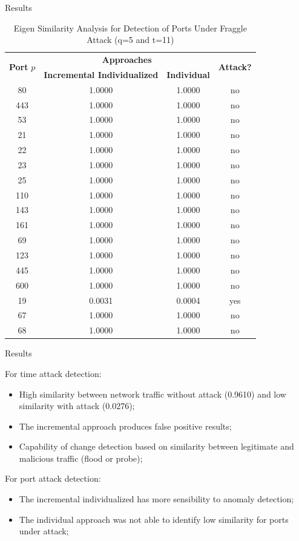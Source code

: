\documentclass[newPxFont, numfooter, sectionpages]{beamer}
\begin{document}
\begin{frame}{Results}
	
	\begin{table}[h!]
	  \centering
	  \tiny
	  \caption{Eigen Similarity Analysis for Detection of Ports Under Fraggle Attack (q=5 and t=11)}
	  \label{tab:tab10}
	  \begin{tabular}{ c c c c }
		\toprule
		\multirow{2}{*}{\textbf{Port} $p$}   &\multicolumn{2}{c}{\textbf{Approaches}} &\multirow{2}{*}{\textbf{Attack?}}\\ 
				\hhline{~--~}
				&\textbf{Incremental Individualized} &\textbf{Individual}\\
		\midrule
		80 &1.0000 &1.0000 &no \\
		443 &1.0000 &1.0000 &no \\
		53 &1.0000 &1.0000 &no \\
		21 &1.0000 &1.0000 &no \\
		22 &1.0000 &1.0000 &no \\
		23 &1.0000 &1.0000 &no \\
		25 &1.0000 &1.0000 &no \\
		110 &1.0000 &1.0000 &no \\
		143 &1.0000 &1.0000 &no \\
		161 &1.0000 &1.0000 &no \\
		69 &1.0000 &1.0000 &no \\
		123 &1.0000 &1.0000 &no \\
		445 &1.0000 &1.0000 &no \\
		600 &1.0000 &1.0000 &no \\
		19 &0.0031 &0.0004 &yes \\
		67 &1.0000 &1.0000 &no \\
		68 &1.0000 &1.0000 &no \\
	    \bottomrule
	  \end{tabular}
	\end{table}
	
\end{frame}
\begin{frame}{Results}
	
	For time attack detection:
	\begin{itemize}
		\item High similarity between network traffic without attack (0.9610) and low similarity with attack (0.0276);
		\item The incremental approach produces false positive results;
		\item Capability of change detection based on similarity between legitimate and malicious traffic (flood or probe);
	\end{itemize}
	
	For port attack detection:
	\begin{itemize}
		\item The incremental individualized has more sensibility to anomaly detection;
		\item The individual approach was not able to identify low similarity for ports under attack;
	\end{itemize}
	
\end{frame}
\end{document}
